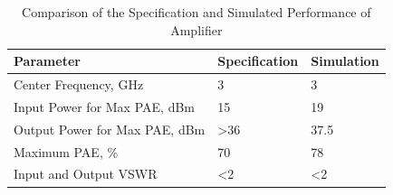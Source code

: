 \begin{table}
    \centering
    \caption{Comparison of the Specification and Simulated Performance of Amplifier}
    \label{table:sim_spec_compare}
    \begin{tabular}{|l|l|l|}
      \hline
      {Parameter}                      & {Specification }   & {Simulation} \\ \hline
      {Center Frequency, GHz}          & 3                  & 3 \\ \hline
      {Input Power for Max PAE, dBm}    & 15                 & 19 \\ \hline
      {Output Power for Max PAE, dBm}  & {\textgreater 36}  & {37.5} \\ \hline
      {Maximum PAE, \%}                & 70                 & 78 \\ \hline
      {Input and Output VSWR}          & {\textless 2}      & {\textless 2} \\ \hline
    \end{tabular}
\end{table}

